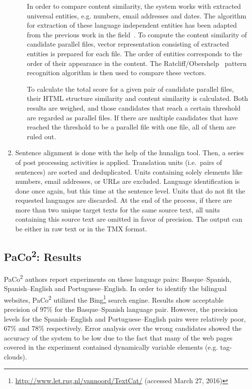 \begin{enumerate}
\begin{enumerate}
		In order to compare content similarity, the system works with extracted universal entities, e.g. numbers, email addresses and dates. The algorithm for extraction of these language independent entities  has been adapted from the previous work in the field~\cite{Nadeau04}. To compute the content similarity of candidate parallel files, vector representation consisting of extracted entities is prepared for each file. The order of entities corresponds to the order of their appearance in the content. The Ratcliff/Obershelp~\cite{Ratcliff88} pattern recognition algorithm is then used to compare these vectors.
		
		To calculate the total score for a given pair of candidate parallel files, their HTML structure similarity and content similarity is calculated. Both results are weighed, and those candidates that reach a certain threshold are regarded as parallel files. If there are multiple candidates that have reached the threshold to be a parallel file with one file, all of them are ruled out.
	\end{enumerate}
	
	\item Sentence alignment is done with the help of the hunalign tool. Then, a series of post processing activities is applied. Translation units (i.e.\ pairs of sentences) are sorted and deduplicated. Units containing solely elements like numbers, email addresses, or URLs are excluded. Language identification is done once again, but this time at the sentence level. Units that do not fit the requested languages are discarded. At the end of the process, if there are more than two unique target texts for the same source text, all units containing this source text are omitted in favor of precision. The output can be either in raw text or in the TMX format.
\end{enumerate}

\subsection{PaCo\textsuperscript{2}: Results}
\label{subsection:paco2_results}

PaCo\textsuperscript{2} authors report experiments on these language pairs: Basque--Spanish, Spanish--English and Portuguese--English. In order to identify the bilingual websites, PaCo\textsuperscript{2} utilized the Bing\footnote{\url{http://www.let.rug.nl/vannoord/TextCat/} (accessed March 27, 2016)} search engine. Results show acceptable precision of $97\%$ for the Basque--Spanish language pair. However, the precision levels for the Spanish--English and Portuguese--English pairs were relatively poor, $67\%$ and $78\%$ respectively. Error analysis over the wrong candidates showed the accuracy of the system to be low due to the fact that many of the web pages covered in the experiment contained dynamically variable elements (e.g. tag-clouds).

